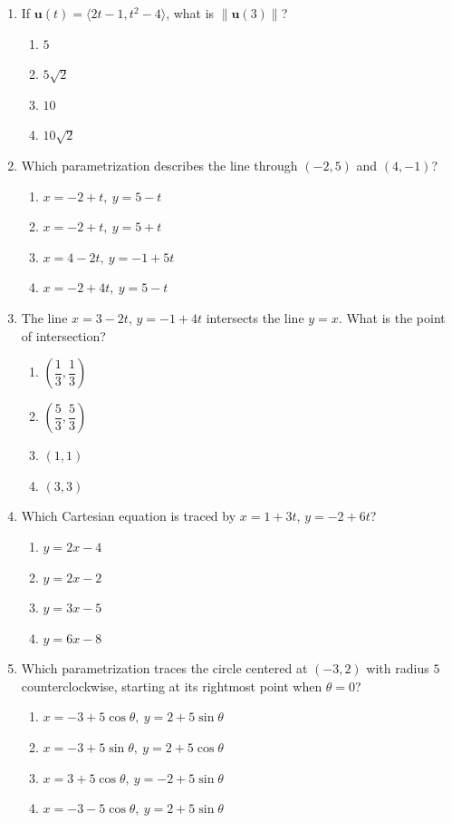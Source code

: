 \documentclass[12pt]{article}
\begin{document}
\begin{enumerate}[leftmargin=*,itemsep=1.1em]
  \item If $\mathbf{u}(t)=\langle 2t-1,t^2-4\rangle$, what is $\|\mathbf{u}(3)\|$?
  \begin{enumerate}[label=\Alph*.,itemsep=0pt]
    \item $5$ \item $5\sqrt2$ \item $10$ \item $10\sqrt2$
  \end{enumerate}

  \item Which parametrization describes the line through $(-2,5)$ and $(4,-1)$?
  \begin{enumerate}[label=\Alph*.,itemsep=0pt]
    \item $x=-2+t,\ y=5-t$
    \item $x=-2+t,\ y=5+t$
    \item $x=4-2t,\ y=-1+5t$
    \item $x=-2+4t,\ y=5-t$
  \end{enumerate}

  \item The line $x=3-2t$, $y=-1+4t$ intersects the line $y=x$. What is the point of intersection?
  \begin{enumerate}[label=\Alph*.,itemsep=0pt]
    \item $\left(\dfrac13,\dfrac13\right)$
    \item $\left(\dfrac53,\dfrac53\right)$
    \item $(1,1)$
    \item $(3,3)$
  \end{enumerate}

  \item Which Cartesian equation is traced by $x=1+3t$, $y=-2+6t$?
  \begin{enumerate}[label=\Alph*.,itemsep=0pt]
    \item $y=2x-4$ \item $y=2x-2$
    \item $y=3x-5$ \item $y=6x-8$
  \end{enumerate}

  \item Which parametrization traces the circle centered at $(-3,2)$ with radius $5$ counterclockwise, starting at its rightmost point when $\theta=0$?
  \begin{enumerate}[label=\Alph*.,itemsep=0pt]
    \item $x=-3+5\cos\theta,\ y=2+5\sin\theta$
    \item $x=-3+5\sin\theta,\ y=2+5\cos\theta$
    \item $x=3+5\cos\theta,\ y=-2+5\sin\theta$
    \item $x=-3-5\cos\theta,\ y=2+5\sin\theta$
  \end{enumerate}


\end{enumerate}
\end{document}
